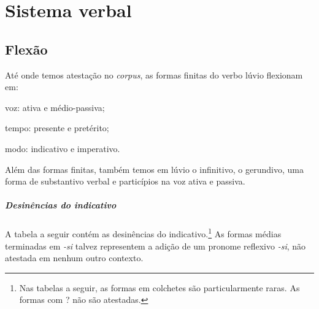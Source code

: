 
\chapter{Sistema verbal}

\section{Flexão}

Até onde temos atestação no \emph{corpus}, as formas finitas do verbo lúvio
flexionam em:
\begin{inparaenum}[(a)]
	\item voz: ativa e médio-passiva;
	\item tempo: presente e pretérito;
	\item modo: indicativo e imperativo.
\end{inparaenum}
Além das formas finitas, também temos em lúvio o infinitivo, o gerundivo, uma
forma de substantivo verbal e particípios na voz ativa e passiva.

\paragraph{Desinências do indicativo}
A tabela a seguir contém as desinências do indicativo.\footnote{Nas tabelas a
	seguir, as formas em colchetes são particularmente raras. As formas com {?} não
	são atestadas.}
As formas médias terminadas em \emph{-si} talvez representem a adição de um
pronome reflexivo \emph{-si}, não atestada em nenhum outro contexto.

